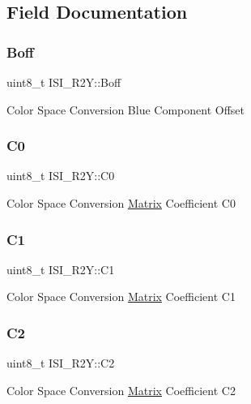 \subsection{Field Documentation}
\mbox{\label{structISI__R2Y_a8191603ccb2a2a126638cbd0216f874d}} 
\subsubsection{\texorpdfstring{Boff}{Boff}}
{\footnotesize\ttfamily uint8\+\_\+t I\+S\+I\+\_\+\+R2\+Y\+::\+Boff}

Color Space Conversion Blue Component Offset \mbox{\label{structISI__R2Y_a7366acddeb1743d0df811516f4c0ef90}} 
\subsubsection{\texorpdfstring{C0}{C0}}
{\footnotesize\ttfamily uint8\+\_\+t I\+S\+I\+\_\+\+R2\+Y\+::\+C0}

Color Space Conversion \mbox{\hyperlink{structMatrix}{Matrix}} Coefficient C0 \mbox{\label{structISI__R2Y_a85e4e58d5f760877816cab069b80c217}} 
\subsubsection{\texorpdfstring{C1}{C1}}
{\footnotesize\ttfamily uint8\+\_\+t I\+S\+I\+\_\+\+R2\+Y\+::\+C1}

Color Space Conversion \mbox{\hyperlink{structMatrix}{Matrix}} Coefficient C1 \mbox{\label{structISI__R2Y_a7534325e6788edd0b70f69fbcd0f020a}} 
\subsubsection{\texorpdfstring{C2}{C2}}
{\footnotesize\ttfamily uint8\+\_\+t I\+S\+I\+\_\+\+R2\+Y\+::\+C2}

Color Space Conversion \mbox{\hyperlink{structMatrix}{Matrix}} Coefficient C2 \mbox{\label{structISI__R2Y_abb41a33da5b3993c0f8724349ba46454}} 
